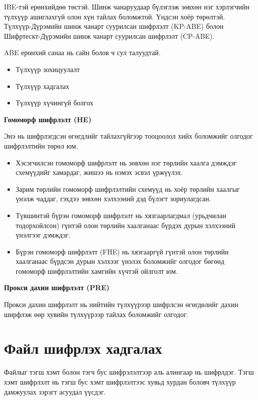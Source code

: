 IBE-тэй ерөнхийдөө төстэй. Шинж чанаруудаар бүлэглэж зөвхөн нэг хэрлэгчийн түлхүүр ашиглахгүй олон хүн тайлах боломжтой.
Үндсэн хоёр төрөлтэй. Түлхүүр-Дүрэмийн шинж чанарт суурилсан шифрлэлт (KP-ABE) болон Шифртескт-Дүрэмийн шинж чанарт суурилсан шифрлэлт (CP-ABE).

ABE ерөнхий санаа нь сайн болов ч сул талуудтай.
\begin{itemize}
    \item Түлхүүр зохицуулалт
    \item Түлхүүр хадгалах
    \item Түлхүүр хүчингүй болгох
\end{itemize}

\textbf{Гомоморф шифрлэлт (HE)}

Энэ нь шифрлэгдсэн өгөгдлийг тайлахгүйгээр тооцоолол хийх боломжийг олгодог шифрлэлтийн төрөл юм.

\begin{itemize}
    \item Хэсэгчилсэн гомоморф шифрлэлт нь зөвхөн нэг төрлийн хаалга дэмждэг схемүүдийг хамардаг, жишээ нь нэмэх эсвэл үржүүлэх.
    \item Зарим төрлийн гомоморф шифрлэлтийн схемүүд нь хоёр төрлийн хаалгыг үнэлж чаддаг, гэхдээ зөвхөн хэлхээний дэд бүлэгт зориулагдсан.
    \item Түвшинтэй бүрэн гомоморф шифрлэлт нь хязгаарлагдмал (урьдчилан тодорхойлсон) гүнтэй олон төрлийн хаалганаас бүрдэх дурын хэлхээний үнэлгээг дэмждэг.
    \item Бүрэн гомоморф шифрлэлт (FHE) нь хязгааргүй гүнтэй олон төрлийн хаалганаас бүрдсэн дурын хэлхээг үнэлэх боломжийг олгодог бөгөөд гомоморф шифрлэлтийн хамгийн хүчтэй ойлголт юм.
\end{itemize}

\textbf{Прокси дахин шифрлэлт (PRE)}

Прокси дахин шифрлэлт нь нийтийн түлхүүрээр шифрлсэн өгөгдөлийг дахин ширфлэж өөр хувийн түлхүүрээр тайлах боломжийг олгодог.


\section{Файл шифрлэх хадгалах}

Файлыг тэгш хэмт болон тэгч бус шифрэлэлтээр аль алингаар нь шифрлдэг. Тэгш хэмт шифрлэлт нь тэгш бус хэмт шифрлэлтээс хувьд хурдан боловч түлхүүр дамжуулах зэрэгт асуудал үүсдэг.

